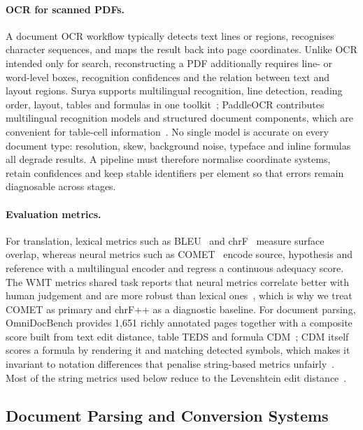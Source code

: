 \paragraph{OCR for scanned PDFs.} A document OCR workflow typically detects
text lines or regions, recognises character sequences, and maps the result back
into page coordinates. Unlike OCR intended only for search, reconstructing a
PDF additionally requires line- or word-level boxes, recognition confidences
and the relation between text and layout regions. Surya supports multilingual
recognition, line detection, reading order, layout, tables and formulas in one
toolkit~\citep{surya}; PaddleOCR contributes multilingual recognition models and
structured document components, which are convenient for table-cell
information~\citep{paddleocr}. No single model is accurate on every document
type: resolution, skew, background noise, typeface and inline formulas all
degrade results. A pipeline must therefore normalise coordinate systems, retain
confidences and keep stable identifiers per element so that errors remain
diagnosable across stages.

\paragraph{Evaluation metrics.} For translation, lexical metrics such as
BLEU~\citep{bleu} and chrF~\citep{chrf} measure surface overlap, whereas neural
metrics such as COMET~\citep{comet} encode source, hypothesis and reference with
a multilingual encoder and regress a continuous adequacy score. The WMT metrics
shared task reports that neural metrics correlate better with human judgement
and are more robust than lexical ones~\citep{wmt-metrics-shared-task}, which is
why we treat COMET as primary and chrF++ as a diagnostic baseline. For document
parsing, OmniDocBench provides 1{,}651 richly annotated pages together with a
composite score built from text edit distance, table TEDS and formula
CDM~\citep{omnidocbench}; CDM itself scores a formula by rendering it and
matching detected symbols, which makes it invariant to notation differences
that penalise string-based metrics unfairly~\citep{cdm}. Most of the string
metrics used below reduce to the Levenshtein edit
distance~\citep{levenshtein}.

\subsection{Document Parsing and Conversion Systems}
\label{subsec:lit-conversion}

